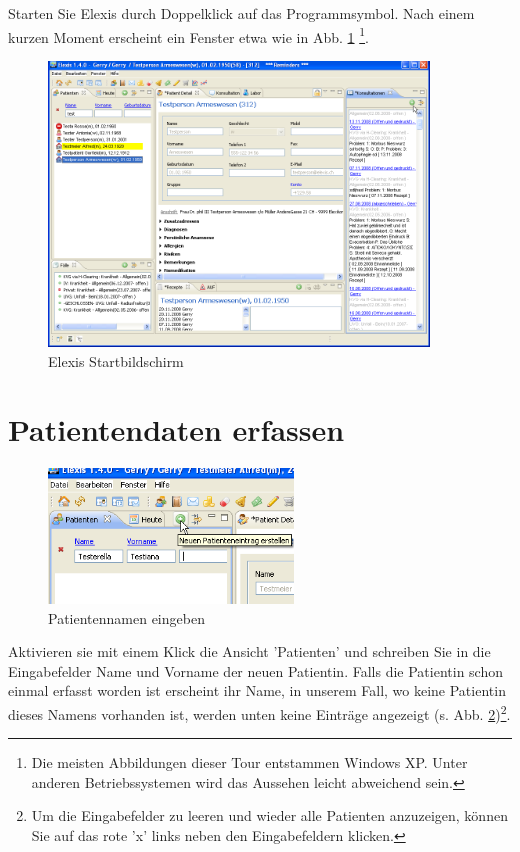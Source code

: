 
Starten Sie Elexis durch Doppelklick auf das Programmsymbol.
Nach einem kurzen Moment erscheint ein Fenster etwa wie in Abb. \ref{fig:startbild} \footnote{Die meisten Abbildungen dieser Tour entstammen Windows XP. Unter anderen Betriebssystemen wird das Aussehen leicht abweichend sein.}.
 \begin{figure}[ht]
    \center
	\includegraphics[width=0.9\textwidth]{images/einf0}
	\caption{Elexis Startbildschirm}
	\label{fig:startbild}
\end{figure}
\section{Patientendaten erfassen}
\begin{figure}
	\includegraphics[width=6.5cm]{images/einf1}
	\caption{Patientennamen eingeben}\label{fig:patname}
\end{figure}
Aktivieren sie mit einem Klick die Ansicht 'Patienten' und schreiben Sie in die Eingabefelder Name und Vorname der neuen Patientin.
Falls die Patientin schon einmal erfasst worden ist erscheint ihr Name, in unserem Fall, wo keine Patientin dieses Namens vorhanden ist, werden unten keine Einträge angezeigt (s. Abb. \ref{fig:patname})\footnote{Um die Eingabefelder zu leeren und wieder alle Patienten anzuzeigen, können Sie auf das rote 'x' links neben den Eingabefeldern klicken.}.

